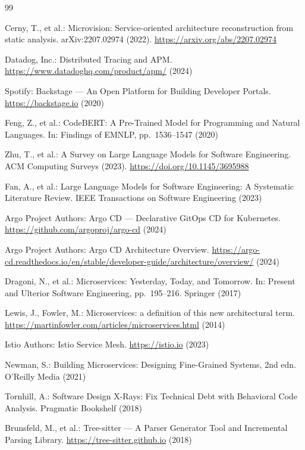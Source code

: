 \documentclass[runningheads]{llncs}
\begin{document}
\begin{thebibliography}{99}

Cerny, T., et al.:
Microvision: Service-oriented architecture reconstruction from static analysis.
arXiv:2207.02974 (2022). \url{https://arxiv.org/abs/2207.02974}

Datadog, Inc.: Distributed Tracing and APM.
\url{https://www.datadoghq.com/product/apm/} (2024)

Spotify: Backstage --- An Open Platform for Building Developer Portals.
\url{https://backstage.io} (2020)

Feng, Z., et al.:
CodeBERT: A Pre-Trained Model for Programming and Natural Languages.
In: Findings of EMNLP, pp.~1536--1547 (2020)

Zhu, T., et al.:
A Survey on Large Language Models for Software Engineering.
ACM Computing Surveys (2023). \url{https://doi.org/10.1145/3695988}

Fan, A., et al.:
Large Language Models for Software Engineering: A Systematic Literature Review.
IEEE Transactions on Software Engineering (2023)

Argo Project Authors: Argo CD --- Declarative GitOps CD for Kubernetes.
\url{https://github.com/argoproj/argo-cd} (2024)

Argo Project Authors: Argo CD Architecture Overview.
\url{https://argo-cd.readthedocs.io/en/stable/developer-guide/architecture/overview/} (2024)

Dragoni, N., et al.:
Microservices: Yesterday, Today, and Tomorrow.
In: Present and Ulterior Software Engineering, pp.~195--216. Springer (2017)

Lewis, J., Fowler, M.:
Microservices: a definition of this new architectural term.
\url{https://martinfowler.com/articles/microservices.html} (2014)

Istio Authors: Istio Service Mesh.
\url{https://istio.io} (2023)

Newman, S.:
Building Microservices: Designing Fine-Grained Systems, 2nd edn.
O'Reilly Media (2021)

Tornhill, A.:
Software Design X-Rays: Fix Technical Debt with Behavioral Code Analysis.
Pragmatic Bookshelf (2018)

Brunsfeld, M., et al.: Tree-sitter --- A Parser Generator Tool and
Incremental Parsing Library.
\url{https://tree-sitter.github.io} (2018)

\end{thebibliography}
\end{document}
